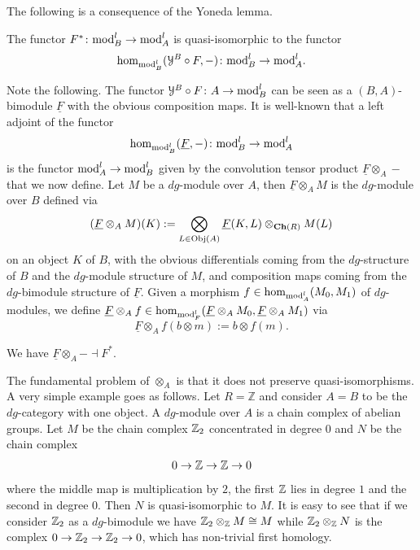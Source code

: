 The following is a consequence of the Yoneda lemma.
\begin{lem}
    The functor $F^*\colon \text{mod}^l_B\to\text{mod}^l_A$ is quasi-isomorphic to the functor $$\hom_{\text{mod}^l_B}(\mathcal{Y}^B\circ F, -)\colon \text{mod}^l_B\to\text{mod}^l_A.$$
\end{lem}

Note the following. The functor $\mathcal{Y}^B\circ F\colon A\to \text{mod}^l_B$ can be seen as a $(B,A)$-bimodule $\underline{F}$ with the obvious composition maps. It is well-known that a left adjoint of the functor $$\hom_{\text{mod}^l_B}(\underline{F},-)\colon \text{mod}^l_B\to \text{mod}^l_A$$ is the functor $\text{mod}^l_A\to \text{mod}^l_B$ given by the convolution tensor product $\underline{F}\otimes_A - $ that we now define.
Let $M$ be a $dg$-module over $A$, then $\underline{F}\otimes_A M$ is the $dg$-module over $B$ defined via $$(\underline{F}\otimes_A M)(K):= \bigotimes_{L\in \text{Obj}(A)}\underline{F}(K,L)\otimes_{\mathbf{Ch}(R)}M(L)$$ on an object $K$ of $B$, with the obvious differentials coming from the $dg$-structure of $B$ and the $dg$-module structure of $M$, and composition maps coming from the $dg$-bimodule structure of $\underline{F}$. Given a morphism $f\in \hom_{\text{mod}^l_A}(M_0,M_1)$ of $dg$-modules, we define $\underline{F}\otimes_Af\in \hom_{\text{mod}^l_F}(\underline{F}\otimes_AM_0,\underline{F}\otimes_AM_1)$ via $$\underline{F}\otimes_A f(b\otimes m):= b\otimes f(m).$$

\begin{cor}
    We have $\underline{F}\otimes_A - \dashv F^*$.
\end{cor}

\begin{example}\label{q.i.tensor}
    The fundamental problem of $\otimes_A$ is that it does not preserve quasi-isomorphisms. A very simple example goes as follows. Let $R=\mathbb{Z}$ and consider $A=B$ to be the $dg$-category with one object. A $dg$-module over $A$ is a chain complex of abelian groups. Let $M$ be the chain complex $\mathbb{Z}_2$ concentrated in degree $0$ and $N$ be the chain complex $$0\to \mathbb{Z}\to\mathbb{Z}\to 0$$ where the middle map is multiplication by $2$, the first $\mathbb{Z}$ lies in degree $1$ and the second in degree $0$. Then $N$ is quasi-isomorphic to $M$. It is easy to see that if we consider $\mathbb{Z}_2$ as a $dg$-bimodule we have $\mathbb{Z}_2\otimes_{\mathbb{Z}} M\cong M$ while $\mathbb{Z}_2\otimes_{\mathbb{Z}} N$ is the complex $0\to\mathbb{Z}_2\to \mathbb{Z}_2\to 0$, which has non-trivial first homology. 
\end{example}


